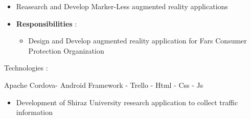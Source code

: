 \documentclass[10pt,a4paper]{altacv}
\begin{document}
\begin{itemize}
\item Reasearch and Develop Marker-Less augmented reality applications
\item \textbf{Responsibilities} :
\begin{itemize}

		\item Design and Develop augmented reality application for Fars Consumer Protection Organization
			
\end{itemize}																				
\end{itemize}
		Technologies : 
                { Apache Cordova- Android Framework - Trello - Html - Css - Js

\divider

    \begin{itemize}
    \item Development of Shiraz University research application to collect traffic information 
    \end{itemize}
\begin{itemize}
\end{itemize}









}
\end{document}
